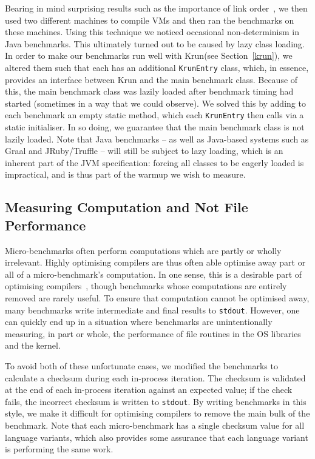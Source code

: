 \documentclass[a4paper,UKenglish]{lipics}
\newcommand{\krun}{Krun\xspace}
\begin{document}
Bearing in mind surprising
results such as the importance of link order~\cite{mytkowicz09surprising}, we
then used two different machines to compile VMs and then ran the benchmarks
on these machines.
Using this technique we noticed occasional non-determinism in Java benchmarks.
This ultimately turned out to be caused by lazy class loading. In order
to make our benchmarks run well with \krun (see Section~\ref{krun}), we
altered them such that each has an additional \texttt{KrunEntry} class,
which, in essence, provides an interface between \krun and the main benchmark
class. Because of this, the main benchmark class was lazily loaded after
benchmark timing had started (sometimes in a way that we could observe). We
solved this by adding to each benchmark an empty static method, which each
\texttt{KrunEntry} then calls via a static initialiser. In so doing, we
guarantee that the main benchmark class is not lazily loaded. Note that Java
benchmarks -- as well as
Java-based systems such as Graal and JRuby/Truffle -- will still be subject to
lazy loading, which is an inherent part of the JVM specification: forcing all
classes to be eagerly loaded is impractical, and is thus part of the warmup we
wish to measure.


\subsection{Measuring Computation and Not File Performance}

Micro-benchmarks often perform computations which are partly or wholly irrelevant. Highly
optimising compilers are thus often able optimise away part or all of a
micro-benchmark's computation. In one sense, this is a desirable part of
optimising compilers~\cite{seaton15phd}, though benchmarks whose computations
are entirely removed are rarely useful. To ensure that computation cannot
be optimised away, many benchmarks write intermediate and final results
to \texttt{stdout}. However, one can quickly end up in a situation where benchmarks are
unintentionally measuring, in part or whole, the performance of file routines in
the OS libraries and the kernel.

To avoid both of these unfortunate cases,
we modified the benchmarks to calculate a checksum during each in-process iteration.
The checksum is validated at the end of each in-process iteration against an expected
value; if the check fails, the incorrect checksum is written to \texttt{stdout}.
By writing benchmarks in
this style, we make it difficult for optimising compilers to remove the
main bulk of the benchmark. Note that each micro-benchmark has a single checksum value for all
language variants, which also provides some assurance that each language variant is
performing the same work.
\end{document}
